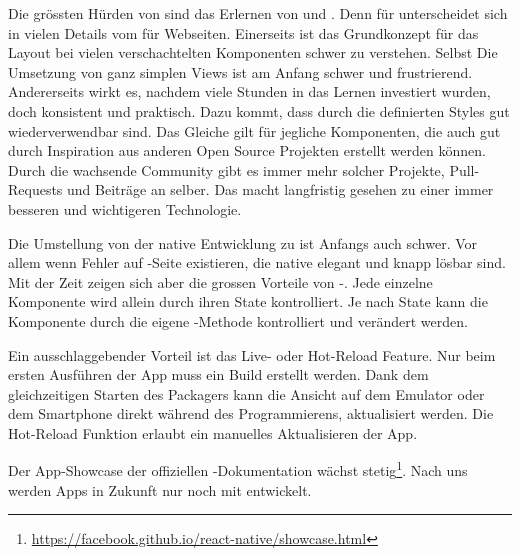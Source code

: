 Die grössten Hürden von  sind das Erlernen von  und . 
Denn  für  unterscheidet sich in vielen Details vom  für Webseiten. 
Einerseits ist das Grundkonzept für das Layout bei vielen verschachtelten Komponenten schwer zu verstehen. 
Selbst Die Umsetzung von ganz simplen Views ist am Anfang schwer und frustrierend. 
Andererseits wirkt es, nachdem viele Stunden in das Lernen investiert wurden, doch konsistent und praktisch. 
Dazu kommt, dass durch  die definierten Styles gut wiederverwendbar sind. 
Das Gleiche gilt für jegliche Komponenten, die auch gut durch Inspiration aus anderen Open Source Projekten erstellt werden können.
Durch die wachsende Community gibt es immer mehr solcher Projekte, Pull-Requests und Beiträge an  selber. 
Das macht  langfristig gesehen zu einer immer besseren und wichtigeren Technologie. 

Die Umstellung von der native Entwicklung zu  ist Anfangs auch schwer. 
Vor allem wenn Fehler auf -Seite existieren, die native elegant und knapp lösbar sind. 
Mit der Zeit zeigen sich aber die grossen Vorteile von -. 
Jede einzelne Komponente wird allein durch ihren State kontrolliert. 
Je nach State kann die Komponente durch die eigene -Methode kontrolliert und verändert werden. 

Ein ausschlaggebender Vorteil ist das Live- oder Hot-Reload Feature. 
Nur beim ersten Ausführen der App muss ein Build erstellt werden.
Dank dem gleichzeitigen Starten des \gls{Packager}s kann die Ansicht auf dem Emulator oder dem Smartphone direkt während des Programmierens, aktualisiert werden. 
Die Hot-Reload Funktion erlaubt ein manuelles Aktualisieren der App. 

Der App-Showcase der offiziellen -Dokumentation wächst stetig\footnote{\url{https://facebook.github.io/react-native/showcase.html}}.\cite{react-native-showcase} 
Nach uns werden Apps in Zukunft nur noch mit  entwickelt.

